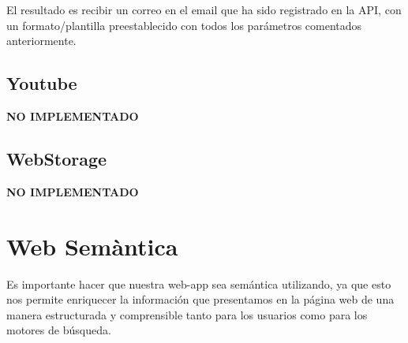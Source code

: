 \documentclass{article}
\begin{document}
    El resultado es recibir un correo en el email que ha sido registrado en la API, con un formato/plantilla preestablecido con todos los parámetros comentados anteriormente.
\subsection{Youtube}
\textbf{NO IMPLEMENTADO}
\subsection{WebStorage}
\textbf{NO IMPLEMENTADO}

\section{Web Semàntica}
Es importante hacer que nuestra web-app sea semántica utilizando, ya que esto nos permite enriquecer la información que presentamos en la página web de una manera estructurada y comprensible tanto para los usuarios como para los motores de búsqueda.\\
\end{document}
